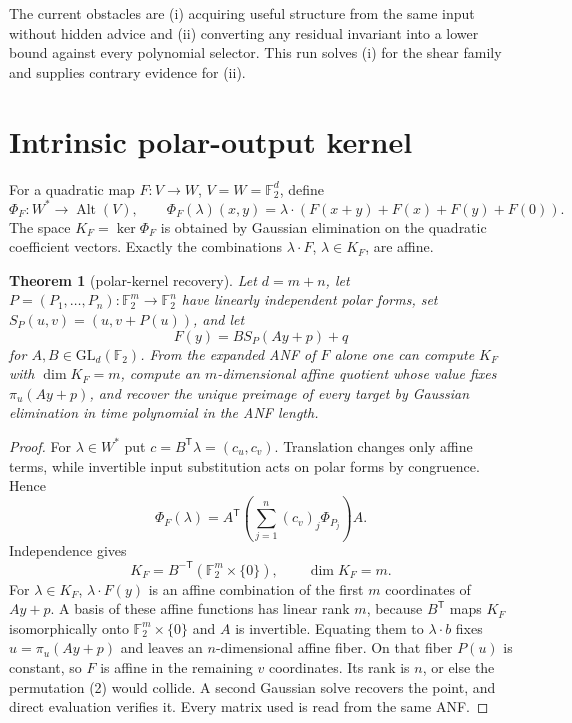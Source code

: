 \documentclass[11pt]{article}
\newtheorem{theorem}{Theorem}
\newcommand{\F}{\mathbb F_2}
\begin{document}
The current obstacles are (i) acquiring useful structure from the same input
without hidden advice and (ii) converting any residual invariant into a
lower bound against every polynomial selector.  This run solves (i) for the
shear family and supplies contrary evidence for (ii).

\section{Intrinsic polar-output kernel}
For a quadratic map $F:V\to W$, $V=W=\F^d$, define
\[
 \Phi_F:W^*\to\operatorname{Alt}(V),\qquad
 \Phi_F(\lambda)(x,y)=\lambda\cdot
 (F(x+y)+F(x)+F(y)+F(0)).                              \tag{1}
\]
The space $K_F=\ker\Phi_F$ is obtained by Gaussian elimination on the
quadratic coefficient vectors.  Exactly the combinations
$\lambda\cdot F$, $\lambda\in K_F$, are affine.

\begin{theorem}[polar-kernel recovery]
Let $d=m+n$, let $P=(P_1,\ldots,P_n):\F^m\to\F^n$ have linearly independent
polar forms, set $S_P(u,v)=(u,v+P(u))$, and let
\[
 F(y)=B S_P(Ay+p)+q                                      \tag{2}
\]
for $A,B\in\mathrm{GL}_d(\F)$.  From the expanded ANF of $F$ alone one can
compute $K_F$ with $\dim K_F=m$, compute an $m$-dimensional affine quotient
whose value fixes $\pi_u(Ay+p)$, and recover the unique preimage of every
target by Gaussian elimination in time polynomial in the ANF length.
\end{theorem}

\begin{proof}
For $\lambda\in W^*$ put $c=B^{\mathsf T}\lambda=(c_u,c_v)$.  Translation
changes only affine terms, while invertible input substitution acts on polar
forms by congruence.  Hence
\[
 \Phi_F(\lambda)=A^{\mathsf T}
 \left(\sum_{j=1}^n(c_v)_j\Phi_{P_j}\right)A.            \tag{3}
\]
Independence gives
\[
 K_F=B^{-\mathsf T}(\F^m\times\{0\}),\qquad \dim K_F=m. \tag{4}
\]
For $\lambda\in K_F$, $\lambda\cdot F(y)$ is an affine combination of the
first $m$ coordinates of $Ay+p$.  A basis of these affine functions has
linear rank $m$, because $B^{\mathsf T}$ maps $K_F$ isomorphically onto
$\F^m\times\{0\}$ and $A$ is invertible.  Equating them to
$\lambda\cdot b$ fixes $u=\pi_u(Ay+p)$ and leaves an $n$-dimensional affine
fiber.  On that fiber $P(u)$ is constant, so $F$ is affine in the remaining
$v$ coordinates.  Its rank is $n$, or else the permutation (2) would collide.
A second Gaussian solve recovers the point, and direct evaluation verifies it.
Every matrix used is read from the same ANF.
\end{proof}
\end{document}

